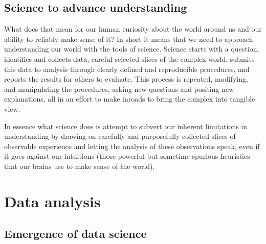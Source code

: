 \documentclass[
  letterpaper,
  DIV=11,
  numbers=noendperiod]{scrreport}
\theoremstyle{definition}
\theoremstyle{remark}
\begin{document}
\hypertarget{science-to-advance-understanding}{%
\subsection{Science to advance
understanding}\label{science-to-advance-understanding}}

What does that mean for our human curiosity about the world around us
and our ability to reliably make sense of it? In short it means that we
need to approach understanding our world with the tools of science.
Science starts with a question, identifies and collects data, careful
selected slices of the complex world, submits this data to analysis
through clearly defined and reproducible procedures, and reports the
results for others to evaluate. This process is repeated, modifying, and
manipulating the procedures, asking new questions and positing new
explanations, all in an effort to make inroads to bring the complex into
tangible view.

In essence what science does is attempt to subvert our inherent
limitations in understanding by drawing on carefully and purposefully
collected slices of observable experience and letting the analysis of
these observations speak, even if it goes against our intuitions (those
powerful but sometime spurious heuristics that our brains use to make
sense of the world).

\hypertarget{data-analysis}{%
\section{Data analysis}\label{data-analysis}}

\hypertarget{emergence-of-data-science}{%
\subsection{Emergence of data science}\label{emergence-of-data-science}}
\end{document}
